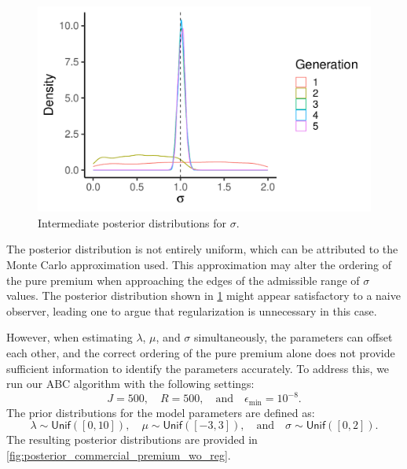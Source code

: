 \documentclass[10pt]{article}
\newcommand*{\UnifDist}{\mathsf{Unif}}
\begin{document}
\begin{figure}[!ht]
  \begin{center}
  \includegraphics[width=0.7\linewidth]{../figures/posterior_sig_iso_supp_mat}
    \caption{Intermediate posterior distributions for $\sigma$.}
    \label{fig:posterior_sig_iso_supp_mat}
  \end{center}
\end{figure}

The posterior distribution is not entirely uniform, which can be attributed to the Monte Carlo approximation used. This approximation may alter the ordering of the pure premium when approaching the edges of the admissible range of \(\sigma\) values. The posterior distribution shown in \cref{fig:posterior_sig_iso_supp_mat} might appear satisfactory to a naive observer, leading one to argue that regularization is unnecessary in this case. 

However, when estimating \(\lambda\), \(\mu\), and \(\sigma\) simultaneously, the parameters can offset each other, and the correct ordering of the pure premium alone does not provide sufficient information to identify the parameters accurately. To address this, we run our ABC algorithm with the following settings:  
$$
J = 500, \quad R = 500, \quad \text{and} \quad \epsilon_{\min} = 10^{-8}.
$$
The prior distributions for the model parameters are defined as:  
$$
\lambda \sim \UnifDist([0, 10]), \quad \mu \sim \UnifDist([-3, 3]), \quad \text{and} \quad \sigma \sim \UnifDist([0, 2]).
$$
The resulting posterior distributions are provided in \cref{fig:posterior_commercial_premium_wo_reg}.
\end{document}
